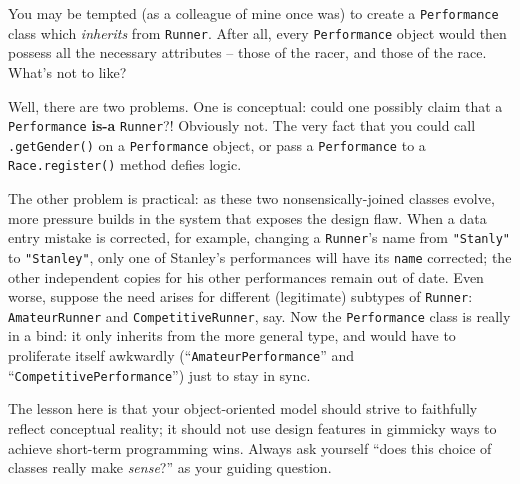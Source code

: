 You may be tempted (as a colleague of mine once was) to create a
\texttt{Performance} class which \textit{inherits} from \texttt{Runner}. After
all, every \texttt{Performance} object would then possess all the necessary
attributes -- those of the racer, and those of the race. What's not to like?

Well, there are two problems. One is conceptual: could one possibly claim that
a \texttt{Performance} \textbf{is-a} \texttt{Runner}?! Obviously not. The very
fact that you could call \texttt{.getGender()} on a \texttt{Performance}
object, or pass a \texttt{Performance} to a \texttt{Race.register()}
method defies logic.

The other problem is practical: as these two nonsensically-joined classes
evolve, more pressure builds in the system that exposes the design flaw. When
a data entry mistake is corrected, for example, changing a \texttt{Runner}'s
name from \texttt{"Stanly"} to \texttt{"Stanley"}, only one of Stanley's
performances will have its \texttt{name} corrected; the other independent
copies for his other performances remain out of date. Even worse, suppose the
need arises for different (legitimate) subtypes of \texttt{Runner}:
\texttt{AmateurRunner} and \texttt{CompetitiveRunner}, say. Now
the \texttt{Performance} class is really in a bind: it only inherits from the
more general type, and would have to proliferate itself awkwardly
(``\texttt{AmateurPerformance}'' and ``\texttt{CompetitivePerformance}'') just
to stay in sync.

The lesson here is that your object-oriented model should strive to faithfully
reflect conceptual reality; it should not use design features in gimmicky ways
to achieve short-term programming wins. Always ask yourself ``does this choice
of classes really make \textit{sense}?'' as your guiding question.

